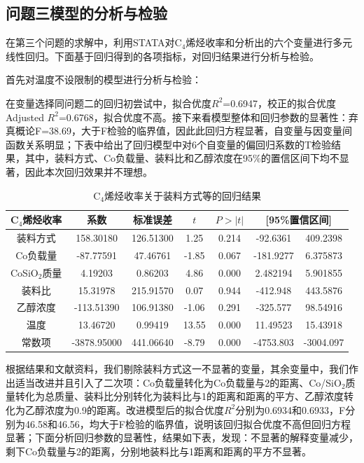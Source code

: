 \documentclass[a4paper,10.5pt]{ctexart}
\begin{document}
\subsection{问题三模型的分析与检验}
\par 在第三个问题的求解中，利用STATA对C$_4$烯烃收率和分析出的六个变量进行多元线性回归。下面基于回归得到的各项指标，对回归结果进行分析与检验。
\par 首先对温度不设限制的模型进行分析与检验：
\par 在变量选择同问题二的回归初尝试中，拟合优度$R^2$=0.6947，校正的拟合优度Adjusted $R^2$=0.6768，拟合优度不高。接下来看模型整体和回归参数的显著性：弃真概论F=38.69，大于F检验的临界值，因此此回归方程显著，自变量与因变量间函数关系明显；下表中给出了回归模型中对6个自变量的偏回归系数的T检验结果，其中，装料方式、Co负载量、装料比和乙醇浓度在95$\%$的置信区间下均不显著，因此本次回归效果并不理想。
\begin{table}[htbp]
  \centering
  \caption{C$_4$烯烃收率关于装料方式等的回归结果}
    \begin{tabular}{ccccccc}
    \toprule[2pt]
    C$_4$烯烃收率 & 系数    & 标准误差  & $t$ & $P>|t|$ & \multicolumn{2}{p{10.225em}}{[95\%置信区间]} \\
    \midrule
    装料方式  & 158.30180  & 126.51300  & 1.25  & 0.214 & -92.6361 & 409.2398 \\
    Co负载量 & -87.77591  & 47.46761  & -1.85 & 0.067 & -181.9277 & 6.375873 \\
    CoSiO$_2$质量 & 4.19203  & 0.86203  & 4.86  & 0.000 & 2.482194 & 5.901855 \\
    装料比   & 15.31978  & 215.91570  & 0.07  & 0.944 & -412.948 & 443.5876 \\
    乙醇浓度  & -113.51390  & 106.91380  & -1.06 & 0.291 & -325.577 & 98.54916 \\
    温度    & 13.46720  & 0.99419  & 13.55 & 0.000 & 11.49523 & 15.43918 \\
    常数项   & -3878.95000  & 441.06640  & -8.79 & 0.000 & -4753.803 & -3004.097 \\
    \bottomrule[2pt]
    \end{tabular}%
  \label{tab:addlabel}%
\end{table}%
\par 根据结果和文献资料，我们剔除装料方式这一不显著的变量，其余变量中，我们作出适当改进并且引入了二次项：Co负载量转化为Co负载量与2的距离、Co/SiO$_2$质量转化为总质量、装料比分别转化为装料比与1的距离和距离的平方、乙醇浓度转化为乙醇浓度为0.9的距离。改进模型后的拟合优度$R^2$分别为0.6934和0.6933，F分别为46.58和46.56，均大于F检验的临界值，说明该回归拟合优度不高但回归方程显著；下面分析回归参数的显著性，结果如下表，发现：不显著的解释变量减少，剩下Co负载量与2的距离，分别地装料比与1距离和距离的平方不显著。
\end{document}
